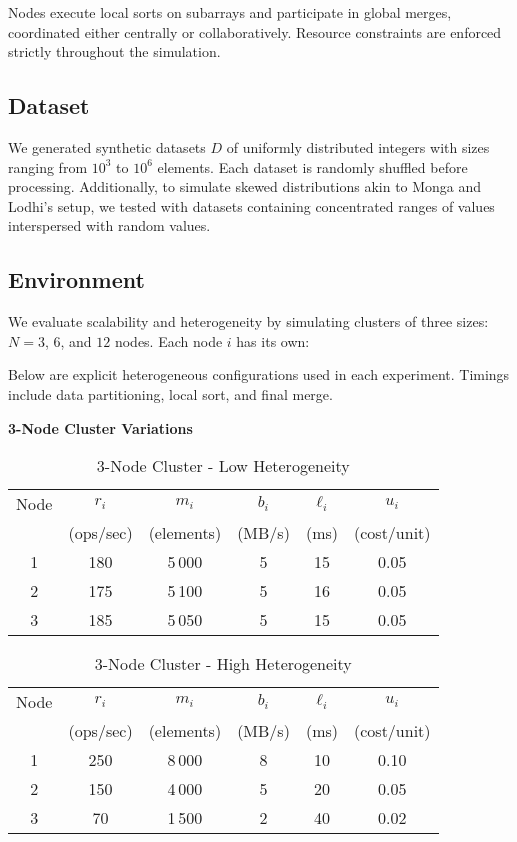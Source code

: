 \documentclass[]{interact}
\theoremstyle{plain}
\theoremstyle{definition}
\theoremstyle{remark}
\begin{document}
Nodes execute local sorts on subarrays and participate in global merges, coordinated either centrally or collaboratively. Resource constraints are enforced strictly throughout the simulation.

\subsection{Dataset}
We generated synthetic datasets $D$ of uniformly distributed integers with sizes ranging from $10^3$ to $10^6$ elements. Each dataset is randomly shuffled before processing. Additionally, to simulate skewed distributions akin to Monga and Lodhi’s setup, we tested with datasets containing concentrated ranges of values interspersed with random values.




\subsection{Environment}

We evaluate scalability and heterogeneity by simulating clusters of three sizes: $N=3$, $6$, and $12$ nodes. Each node $i$ has its own:

Below are explicit heterogeneous configurations used in each experiment. Timings include data partitioning, local sort, and final merge.

\medskip
\textbf{3-Node Cluster Variations}

\begin{table}[H]
  \centering
  \caption{3-Node Cluster - Low Heterogeneity}
  \label{tab:env3low}
  \begin{tabular}{c|ccccc}
    \toprule
    Node & $r_i$ & $m_i$ & $b_i$ & $\ell_i$ & $u_i$ \\
         & (ops/sec) & (elements) & (MB/s) & (ms) & (cost/unit) \\
    \midrule
    1 & 180 & 5\,000 & 5 & 15 & 0.05 \\
    2 & 175 & 5\,100 & 5 & 16 & 0.05 \\
    3 & 185 & 5\,050 & 5 & 15 & 0.05 \\
    \bottomrule
  \end{tabular}
\end{table}

\begin{table}[H]
  \centering
  \caption{3-Node Cluster - High Heterogeneity}
  \label{tab:env3high}
  \begin{tabular}{c|ccccc}
    \toprule
    Node & $r_i$ & $m_i$ & $b_i$ & $\ell_i$ & $u_i$ \\
         & (ops/sec) & (elements) & (MB/s) & (ms) & (cost/unit) \\
    \midrule
    1 & 250 & 8\,000 & 8 & 10 & 0.10 \\
    2 & 150 & 4\,000 & 5 & 20 & 0.05 \\
    3 & 70  & 1\,500 & 2 & 40 & 0.02 \\
    \bottomrule
  \end{tabular}
\end{table}
\end{document}
